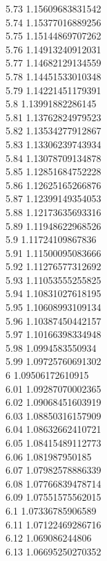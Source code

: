 {5.73	1.15609683831542\\
5.74	1.15377016889256\\
5.75	1.15144869707262\\
5.76	1.14913240912031\\
5.77	1.14682129134559\\
5.78	1.14451533010348\\
5.79	1.14221451179391\\
5.8	1.13991882286145\\
5.81	1.13762824979523\\
5.82	1.13534277912867\\
5.83	1.13306239743934\\
5.84	1.13078709134878\\
5.85	1.12851684752228\\
5.86	1.12625165266876\\
5.87	1.12399149354053\\
5.88	1.12173635693316\\
5.89	1.11948622968526\\
5.9	1.11724109867836\\
5.91	1.11500095083666\\
5.92	1.11276577312692\\
5.93	1.11053555255825\\
5.94	1.10831027618195\\
5.95	1.10608993109134\\
5.96	1.10387450442157\\
5.97	1.10166398334948\\
5.98	1.0994583550934\\
5.99	1.09725760691302\\
6	1.09506172610915\\
6.01	1.09287070002365\\
6.02	1.09068451603919\\
6.03	1.08850316157909\\
6.04	1.08632662410721\\
6.05	1.08415489112773\\
6.06	1.081987950185\\
6.07	1.07982578886339\\
6.08	1.07766839478714\\
6.09	1.07551575562015\\
6.1	1.07336785906589\\
6.11	1.07122469286716\\
6.12	1.069086244806\\
6.13	1.06695250270352\\
}
